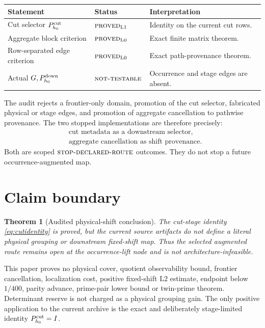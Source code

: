 \documentclass[11pt]{article}
\newtheorem{theorem}{Theorem}[section]
\theoremstyle{definition}
\theoremstyle{remark}
\newcommand{\NT}{\textnormal{\textsc{not-testable}}}
\newcommand{\PROVED}{\textnormal{\textsc{proved}}}
\newcommand{\STOP}{\textnormal{\textsc{stop-declared-route}}}
\newcommand{\Lzero}{\mathrm{L0}}
\newcommand{\Lone}{\mathrm{L1}}
\newcommand{\Ltwo}{\mathrm{L2}}
\begin{document}
\begin{center}
\small
\begin{tabularx}{\textwidth}{@{}P{0.41\textwidth}P{0.20\textwidth}Y@{}}
\toprule
Statement & Status & Interpretation\\
\midrule
Cut selector \(P_{h_0}^{\rm cut}\)
& \(\PROVED_{\Lone}\) & Identity on the current cut rows.\\
Aggregate block criterion
& \(\PROVED_{\Lzero}\) & Exact finite matrix theorem.\\
Row-separated edge criterion
& \(\PROVED_{\Lzero}\) & Exact path-provenance theorem.\\
Actual \(G,P_{h_0}^{\rm down}\)
& \(\NT\) & Occurrence and stage edges are absent.\\
\bottomrule
\end{tabularx}
\end{center}

The audit rejects a frontier-only domain, promotion of the cut
selector, fabricated physical or stage edges, and promotion of
aggregate cancellation to pathwise provenance.  The two stopped
implementations are therefore precisely:
\[
\begin{split}
&\text{cut metadata as a downstream selector},\\
&\text{aggregate cancellation as shift provenance}.
\end{split}
\]
Both are scoped \(\STOP\) outcomes.  They do not stop a future
occurrence-augmented map.

\section{Claim boundary}

\begin{theorem}[Audited physical-shift conclusion]
The cut-stage identity \eqref{eq:cutidentity} is proved, but the
current source artifacts do not define a literal physical grouping
or downstream fixed-shift map.  Thus the selected augmented route
remains open at the occurrence-lift node and is not
architecture-infeasible.
\end{theorem}

This paper proves no physical cover, quotient observability bound,
frontier cancellation, localization cost, positive fixed-shift
\(\Ltwo\) estimate, endpoint below \(1/400\), parity advance,
prime-pair lower bound or twin-prime theorem.  Determinant reserve is
not charged as a physical grouping gain.  The only positive
application to the current archive is the exact and deliberately
stage-limited identity \(P_{h_0}^{\rm cut}=I\).

\begingroup
\small
\raggedright


\endgroup
\end{document}
